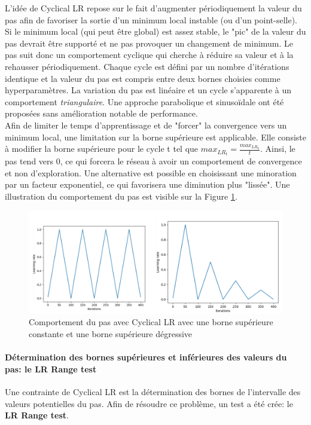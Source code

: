 \noindent L'idée de Cyclical LR repose sur le fait d'augmenter périodiquement la valeur du pas afin de favoriser la sortie d'un minimum local instable (ou d'un point-selle). Si le minimum local (qui peut être global) est assez stable, le "pic" de la valeur du pas devrait être supporté et ne pas provoquer un changement de minimum. Le pas suit donc un comportement cyclique qui cherche à réduire sa valeur et à la rehausser périodiquement. Chaque cycle est défini par un nombre d'itérations identique et la valeur du pas est compris entre deux bornes choisies comme hyperparamètres. La variation du pas est linéaire et un cycle s'apparente à un comportement \textit{triangulaire}. Une approche parabolique et sinusoïdale ont été proposées sans amélioration notable de performance. \\

\noindent Afin de limiter le temps d'apprentissage et de "forcer" la convergence vers un minimum local, une limitation sur la borne supérieure est applicable. Elle consiste à modifier la borne supérieure pour le cycle t tel que $max_{LR_t}=\frac{max_{LR_0}}{t}$. Ainsi, le pas tend vers 0, ce qui forcera le réseau à avoir un comportement de convergence et non d'exploration. Une alternative est possible en choisissant une minoration par un facteur exponentiel, ce qui favorisera une diminution plus "lissée". Une illustration du comportement du pas est visible sur la Figure \ref{cyclicallr}.

\begin{figure}
    \centering
    \includegraphics[scale=0.3]{./tex/fondamentaux/cyclicallr.png}
    \caption{Comportement du pas avec Cyclical LR avec une borne supérieure constante et une borne supérieure dégressive}
    \label{cyclicallr}
\end{figure}

\paragraph{Détermination des bornes supérieures et inférieures des valeurs du pas: le LR Range test}
Une contrainte de Cyclical LR est la détermination des bornes de l'intervalle des valeurs potentielles du pas. Afin de résoudre ce problème, un test a été crée: le \textbf{LR Range test}\cite{cyclicallr}.\\

